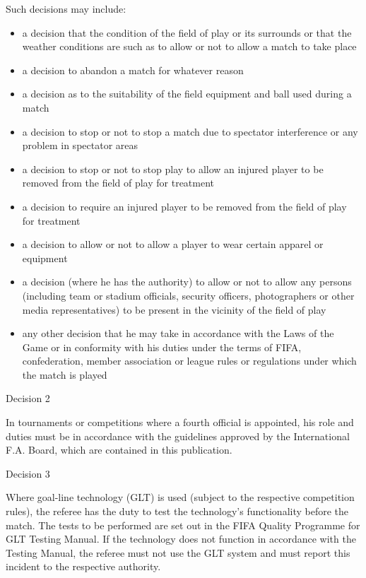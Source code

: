 Such decisions may include:

\begin{itemize}
\item a decision that the condition of the field of play or its surrounds or that the weather conditions are such as to allow or not to allow a match to take place
\item a decision to abandon a match for whatever reason
\item a decision as to the suitability of the field equipment and ball used during a match
\item a decision to stop or not to stop a match due to spectator interference or any problem in spectator areas 
\item a decision to stop or not to stop play to allow an injured player to be removed from the field of play for treatment 
\item a decision to require an injured player to be removed from the field of play for treatment 
\item a decision to allow or not to allow a player to wear certain apparel or equipment 
\item a decision (where he has the authority) to allow or not to allow any persons (including team or stadium officials, security officers, photographers or other media representatives) to be present in the vicinity of the field of play 
\item any other decision that he may take in accordance with the Laws of the Game or in conformity with his duties under the terms of FIFA, confederation, member association or league rules or regulations under which the match is played 
\end{itemize}

\bigskip

Decision 2

In tournaments or competitions where a fourth official is appointed, his role and duties must be in accordance with the guidelines approved by the International F.A. Board, which are contained in this publication.

\bigskip

Decision 3

Where goal-line technology (GLT) is used (subject to the respective competition rules), the referee has the duty to test the technology's functionality before the match. The tests to be performed are set out in the FIFA Quality Programme for GLT Testing Manual. If the technology does not function in accordance with the Testing Manual, the referee must not use the GLT system and must report this incident to the respective authority. 